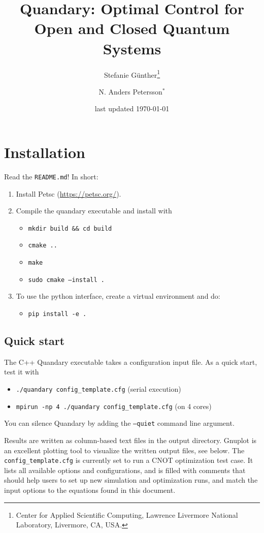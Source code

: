 \documentclass[11pt]{article}
\title{Quandary: Optimal Control for Open and Closed Quantum Systems}
\author{Stefanie G{\"u}nther\thanks{Center for Applied Scientific Computing, Lawrence Livermore National Laboratory, Livermore, CA, USA.} \and N. Anders Petersson$^*$}
\date{last updated \today}
\begin{document}
\maketitle


\section*{Installation}
 Read the \texttt{README.md}! In short:
 \begin{enumerate}
  \item Install Petsc (\url{https://petsc.org/}).
  \item Compile the quandary executable and install with
  \begin{itemize}
    \item[$>$] \texttt{mkdir build \&\& cd build}
    \item[$>$] \texttt{cmake ..}
    \item[$>$] \texttt{make}
    \item[$>$] \texttt{sudo cmake --install .}
  \end{itemize}
  \item To use the python interface, create a virtual environment and do:
  \begin{itemize}
    \item[$>$] \texttt{pip install -e .}
  \end{itemize}
 \end{enumerate}

 
 \subsection*{Quick start} 
 
The C++ Quandary executable takes a configuration input file. As a quick start, test it with 
\begin{itemize}
  \item[$>$]  \texttt{./quandary config\_template.cfg}  \hfill (serial execution)
  \item[$>$]  \texttt{mpirun -np 4 ./quandary config\_template.cfg}  \hfill (on 4 cores)
\end{itemize}
You can silence Quandary by adding the \texttt{--quiet} command line argument.

Results are written as column-based text files in the output directory. Gnuplot is an excellent plotting tool to visualize the written output files, see below. The \texttt{config\_template.cfg} is currently set to run a CNOT optimization test case. It lists all available options and configurations, and is filled with comments that should help users to set up new simulation and optimization runs, and match the input options to the equations found in this document. 
\end{document}
